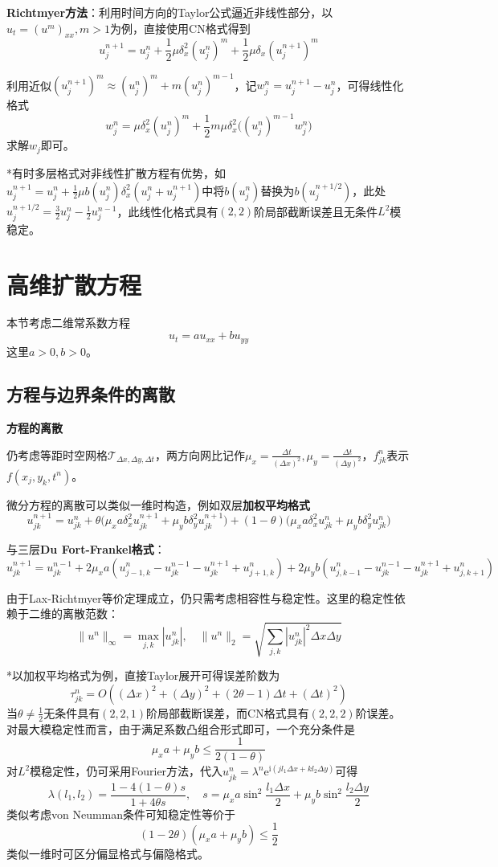 \documentclass[a4paper,UTF8,fontset=windows]{ctexart}
\begin{document}
\textbf{Richtmyer方法}：利用时间方向的Taylor公式逼近非线性部分，以$u_t=(u^m)_{xx},m>1$为例，直接使用CN格式得到
$$u_j^{n+1}=u_j^n+\frac{1}{2}\mu\delta_x^2(u_j^n)^m+\frac{1}{2}\mu\delta_x(u_j^{n+1})^m$$

利用近似$(u_j^{n+1})^m\approx(u_j^n)^m+m(u_j^n)^{m-1}$，记$w_j^n=u_j^{n+1}-u_j^n$，可得线性化格式
$$w_j^n=\mu\delta_x^2(u_j^n)^m+\frac{1}{2}m\mu\delta_x^2\big((u_j^n)^{m-1}w_j^n\big)$$
求解$w_j$即可。

*有时多层格式对非线性扩散方程有优势，如$u_j^{n+1}=u_j^n+\frac{1}{2}\mu b(u_j^n)\delta_x^2(u_j^n+u_j^{n+1})$中将$b(u_j^n)$替换为$b(u_j^{n+1/2})$，此处$u_j^{n+1/2}=\frac{3}{2}u_j^n-\frac{1}{2}u_j^{n-1}$，此线性化格式具有$(2,2)$阶局部截断误差且无条件$L^2$模稳定。

\section{高维扩散方程}
本节考虑二维常系数方程
$$u_t=au_{xx}+bu_{yy}$$
这里$a>0,b>0$。

\subsection{方程与边界条件的离散}
\textbf{方程的离散}

仍考虑等距时空网格$\mathcal{T}_{\Delta x,\Delta y,\Delta t}$，两方向网比记作$\mu_x=\frac{\Delta t}{(\Delta x)^2},\mu_y=\frac{\Delta t}{(\Delta y)^2}$，$f_{jk}^n$表示$f(x_j,y_k,t^n)$。

微分方程的离散可以类似一维时构造，例如双层\textbf{加权平均格式}
$$u_{jk}^{n+1}=u_{jk}^n+\theta\big(\mu_xa\delta_x^2u_{jk}^{n+1}+\mu_yb\delta_y^2u_{jk}^{n+1}\big)+(1-\theta)\big(\mu_xa\delta_x^2u_{jk}^n+\mu_yb\delta_y^2u_{jk}^n\big)$$

与三层\textbf{Du Fort-Frankel格式}：
$$u_{jk}^{n+1}=u_{jk}^{n-1}+2\mu_xa(u_{j-1,k}^n-u_{jk}^{n-1}-u_{jk}^{n+1}+u_{j+1,k}^n)+2\mu_yb(u_{j,k-1}^n-u_{jk}^{n-1}-u_{jk}^{n+1}+u_{j,k+1}^n)$$

由于Lax-Richtmyer等价定理成立，仍只需考虑相容性与稳定性。这里的稳定性依赖于二维的离散范数：
$$\|u^n\|_\infty=\max_{j,k}|u_{jk}^n|,\quad\|u^n\|_2=\sqrt{\sum_{j,k}|u_{jk}^n|^2\Delta x\Delta y}$$

*以加权平均格式为例，直接Taylor展开可得误差阶数为
$$\tau_{jk}^n=O((\Delta x)^2+(\Delta y)^2+(2\theta-1)\Delta t+(\Delta t)^2)$$
当$\theta\ne\frac{1}{2}$无条件具有$(2,2,1)$阶局部截断误差，而CN格式具有$(2,2,2)$阶误差。对最大模稳定性而言，由于满足系数凸组合形式即可，一个充分条件是
$$\mu_xa+\mu_yb\le\frac{1}{2(1-\theta)}$$
对$L^2$模稳定性，仍可采用Fourier方法，代入$u_{jk}^n=\lambda^n\mathrm{e}^{\mathrm{i}(jl_1\Delta x+kl_2\Delta y)}$可得
$$\lambda(l_1,l_2)=\frac{1-4(1-\theta)s}{1+4\theta s},\quad s=\mu_xa\sin^2\frac{l_1\Delta x}{2}+\mu_yb\sin^2\frac{l_2\Delta y}{2}$$
类似考虑von Neumman条件可知稳定性等价于
$$(1-2\theta)(\mu_xa+\mu_yb)\le\frac{1}{2}$$
类似一维时可区分偏显格式与偏隐格式。
\end{document}
